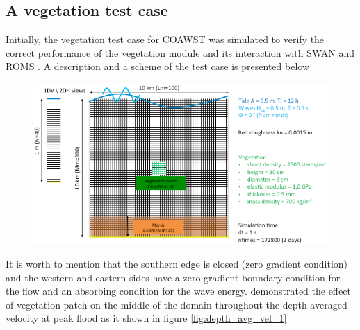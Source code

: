 \documentclass[12pt]{article}
\begin{document}
\subsection{A vegetation test case}

Initially, the vegetation test case for COAWST was simulated to verify the correct performance of the vegetation module and its interaction with SWAN and ROMS \parencite{Beudin2017}. A description and a scheme of the test case is presented below 

\begin{figure}[H]
    \centering
    \includegraphics[scale=0.6]{plots/vegetation_test.png}
    \caption{}
    \label{fig:}
\end{figure}

It is worth to mention that the southern edge is closed (zero gradient condition) and the western and eastern sides have a zero gradient boundary condition for the flow and an absorbing condition for the wave energy. \textcite{Beudin2017} demonstrated the effect of vegetation patch on the middle of the domain throughout the depth-averaged velocity at peak flood as it shown in figure \ref{fig:depth_avg_vel_1}
\end{document}
